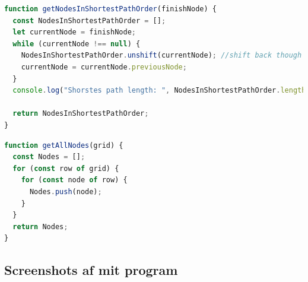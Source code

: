 \documentclass[12pt]{article}
\begin{document}
\begin{lstlisting}[language=JavaScript, caption=Kode for finde korteste vej]
  function getNodesInShortestPathOrder(finishNode) {
  const NodesInShortestPathOrder = [];
  let currentNode = finishNode;
  while (currentNode !== null) {
    NodesInShortestPathOrder.unshift(currentNode); //shift back though finishNode
    currentNode = currentNode.previousNode;
  }
  console.log("Shorstes path length: ", NodesInShortestPathOrder.length);

  return NodesInShortestPathOrder;
}
\end{lstlisting}
\begin{lstlisting}[language=JavaScript, caption=Kode for finde alle nodes i grid, label={lst:getAllNodes}]
function getAllNodes(grid) {
  const Nodes = [];
  for (const row of grid) {
    for (const node of row) {
      Nodes.push(node);
    }
  }
  return Nodes;
}
\end{lstlisting}
\newpage
\subsection{Screenshots af mit program}

\begin{figure}[ht]%
  \centering
  \qquad
  \label{fig:Vizualication}%
\end{figure}

\end{document}
